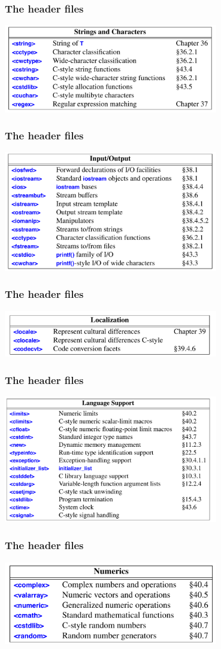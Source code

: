 \begin{frame}
  \frametitle{The header files}
  \centering
  \includegraphics[width=0.7\textwidth]{img/head_05.png}
\end{frame}
\begin{frame}
  \frametitle{The header files}
  \centering
  \includegraphics[width=0.7\textwidth]{img/head_06.png}
\end{frame}
\begin{frame}
  \frametitle{The header files}
  \centering
  \includegraphics[width=0.7\textwidth]{img/head_07.png}
\end{frame}
\begin{frame}
  \frametitle{The header files}
  \centering
  \includegraphics[width=0.7\textwidth]{img/head_08.png}
\end{frame}
\begin{frame}
  \frametitle{The header files}
  \centering
  \includegraphics[width=0.7\textwidth]{img/head_09.png}
\end{frame}

